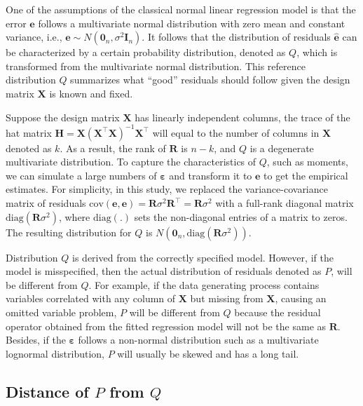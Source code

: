 \documentclass[]{interact}
\theoremstyle{plain}%
\theoremstyle{definition}
\theoremstyle{remark}
\begin{document}
One of the assumptions of the classical normal linear regression model
is that the error \(\boldsymbol{e}\) follows a multivariate normal
distribution with zero mean and constant variance, i.e.,
\(\boldsymbol{e} \sim N(\boldsymbol{0}_n,\sigma^2\boldsymbol{I}_n)\). It
follows that the distribution of residuals \(\hat{\boldsymbol{e}}\) can
be characterized by a certain probability distribution, denoted as
\(Q\), which is transformed from the multivariate normal distribution.
This reference distribution \(Q\) summarizes what ``good'' residuals
should follow given the design matrix \(\boldsymbol{X}\) is known and
fixed.

Suppose the design matrix \(\boldsymbol{X}\) has linearly independent
columns, the trace of the hat matrix
\(\boldsymbol{H} = \boldsymbol{X}(\boldsymbol{X}^\top\boldsymbol{X})^{-1}\boldsymbol{X}^\top\)
will equal to the number of columns in \(\boldsymbol{X}\) denoted as
\(k\). As a result, the rank of \(\boldsymbol{R}\) is \(n - k\), and
\(Q\) is a degenerate multivariate distribution. To capture the
characteristics of \(Q\), such as moments, we can simulate a large
numbers of \(\boldsymbol{\varepsilon}\) and transform it to
\(\boldsymbol{e}\) to get the empirical estimates. For simplicity, in
this study, we replaced the variance-covariance matrix of residuals
\(\text{cov}(\boldsymbol{e}, \boldsymbol{e}) = \boldsymbol{R}\sigma^2\boldsymbol{R}^\top = \boldsymbol{R}\sigma^2\)
with a full-rank diagonal matrix
\(\text{diag}(\boldsymbol{R}\sigma^2)\), where \(\text{diag}(.)\) sets
the non-diagonal entries of a matrix to zeros. The resulting
distribution for \(Q\) is
\(N(\boldsymbol{0}_n, \text{diag}(\boldsymbol{R}\sigma^2))\).

Distribution \(Q\) is derived from the correctly specified model.
However, if the model is misspecified, then the actual distribution of
residuals denoted as \(P\), will be different from \(Q\). For example,
if the data generating process contains variables correlated with any
column of \(\boldsymbol{X}\) but missing from \(\boldsymbol{X}\),
causing an omitted variable problem, \(P\) will be different from \(Q\)
because the residual operator obtained from the fitted regression model
will not be the same as \(\boldsymbol{R}\). Besides, if the
\(\boldsymbol{\varepsilon}\) follows a non-normal distribution such as a
multivariate lognormal distribution, \(P\) will usually be skewed and
has a long tail.

\subsection{\texorpdfstring{Distance of \(P\) from
\(Q\)}{Distance of P from Q}}\label{distance-of-p-from-q}
\end{document}
